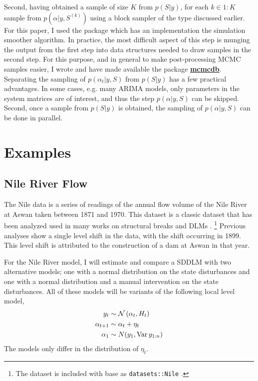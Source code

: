 \documentclass{article}
\begin{document}
Second, having obtained a sample of size $K$ from $p(S | y)$, for each $k \in 1:K$ sample from $p(\alpha | y, S^{(k)})$ using a block sampler of the type discussed earlier.
For this paper, I used the \RLang{} package  \parencite{Helske2012} which has an implementation the \textcite{DurbinKoopman2002} simulation smoother algorithm.
In practice, the most difficult aspect of this step is munging the output from the first step into data structures needed to draw samples in the second step.
For this purpose, and in general to make post-processing MCMC samples easier, I wrote and have made available the \RLang{} package \href{https://github.com/jrnold/mcmcdb}{\textbf{mcmcdb}}.
Separating the sampling of $p(\alpha_{t} | y, S)$ from $p(S | y)$ has a few practical advantages.
In some cases, e.g. many ARIMA models, only parameters in the system matrices are of interest, and thus the step $p(\alpha | y, S)$ can be skipped.
Second, once a sample from $p(S | y)$ is obtained, the sampling of $p(\alpha | y, S)$ can be done in parallel.

\section{Examples}
\label{sec:examples}

\subsection{Nile River Flow}
\label{sec:nile}

The Nile data is a series of readings of the annual flow volume of the Nile River at Aswan taken between 1871 and 1970.
This dataset is a classic dataset that has been analyzed used in many works on structural breaks and DLMs \parencites{Cobb1978}{Balke1993}{JongPenzer1998}{DurbinKoopman2001}{CommandeurKoopmanOoms2011}.%
\footnote{The dataset is included with base \RLang{} as \texttt{datasets::Nile} \parencite{RCT2013}.}
Previous analyses show a single level shift in the data, with the shift occurring in 1899.
This level shift is attributed to the construction of a dam at Aswan in that year.

For the Nile River model, I will estimate and compare a SDDLM with two alternative models; one with a normal distribution on the state disturbances and one with a normal distribution and a manual intervention on the state disturbances.
All of these models will be variants of the following local level model,
\begin{equation}
  \label{eq:21}
  \begin{aligned}[t]
    y_{t} &\sim \mathcal{N}\left(\alpha_{t}, H_{t}\right) \\
    \alpha_{t + 1} &\sim \alpha_{t} + \eta_{t} \\
    \alpha_{1} &\sim N(y_{1}, \operatorname{Var} y_{1:n})
  \end{aligned}
\end{equation}
The models only differ in the distribution of $\eta_{t}$.
\end{document}

